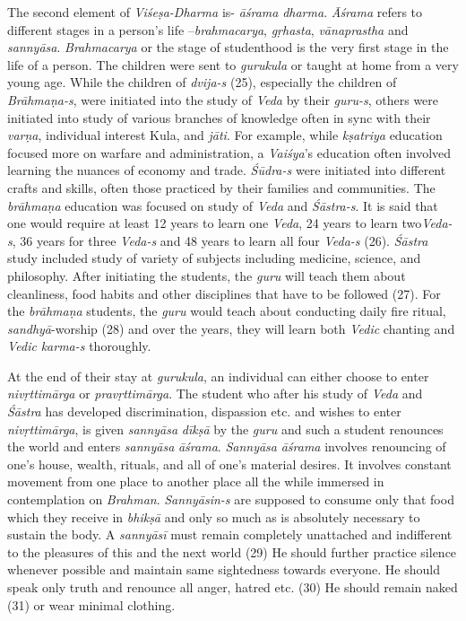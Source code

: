 The second element of \emph{Viśeṣa-Dharma} is- \emph{āśrama} \emph{dharma}. \emph{Āśrama} refers to different stages in a person's life --\emph{brahmacarya}, \emph{gṛhasta}, \emph{vānaprastha} and \emph{sannyāsa}. \emph{Brahmacarya} or the stage of studenthood is the very first stage in the life of a person. The children were sent to \emph{gurukula} or taught at home from a very young age. While the children of \emph{dvija-s} (25), especially the children of \emph{Brāhmaṇa-s}, were initiated into the study of \emph{Veda} by their \emph{guru-s}, others were initiated into study of various branches of knowledge often in sync with their \emph{varṇa}, individual interest Kula, and \emph{jāti}. For example, while \emph{kṣatriya} education focused more on warfare and administration, a \emph{Vaiśya}'s education often involved learning the nuances of economy and trade. \emph{Śūdra-s} were initiated into different crafts and skills, often those practiced by their families and communities. The \emph{brāhmaṇa} education was focused on study of \emph{Veda} and \emph{Śāstra-s}. It is said that one would require at least 12 years to learn one \emph{Veda}, 24 years to learn two\emph{Veda-s}, 36 years for three \emph{Veda-s} and 48 years to learn all four \emph{Veda-s} (26). \emph{Śāstra} study included study of variety of subjects including medicine, science, and philosophy. After initiating the students, the \emph{guru} will teach them about cleanliness, food habits and other disciplines that have to be followed (27). For the \emph{brāhmaṇa} students, the \emph{guru} would teach about conducting daily fire ritual, \emph{sandhyā}-worship (28) and over the years, they will learn both \emph{Vedic} chanting and \emph{Vedic} \emph{karma-s} thoroughly.

At the end of their stay at \emph{gurukula}, an individual can either choose to enter \emph{nivṛttimārga} or \emph{pravṛttimārga}. The student who after his study of \emph{Veda} and \emph{Śāstra} has developed discrimination, dispassion etc. and wishes to enter \emph{nivṛttimārga}, is given \emph{sannyāsa} \emph{dīkṣā} by the \emph{guru} and such a student renounces the world and enters \emph{sannyāsa} \emph{āśrama}. \emph{Sannyāsa} \emph{āśrama} involves renouncing of one's house, wealth, rituals, and all of one's material desires. It involves constant movement from one place to another place all the while immersed in contemplation on \emph{Brahman}. \emph{Sannyāsin-s} are supposed to consume only that food which they receive in \emph{bhikṣā} and only so much as is absolutely necessary to sustain the body. A \emph{sannyāsī} must remain completely unattached and indifferent to the pleasures of this and the next world (29) He should further practice silence whenever possible and maintain same sightedness towards everyone. He should speak only truth and renounce all anger, hatred etc. (30) He should remain naked (31) or wear minimal clothing.

